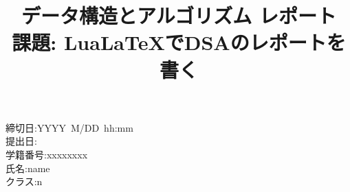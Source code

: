 \documentclass{article}
\title{\bf データ構造とアルゴリズム レポート \\ 課題: Lua\LaTeX でDSAのレポートを書く}
\author{}
\date{}
\begin{document}
\maketitle

\begin{description}
	\item[\rm \large 締切日:YYYY\, M/DD\, hh:mm]
	\item[\rm \large 提出日: \editdate ]
	\item[\rm \large 学籍番号:xxxxxxxx]
	\item[\rm \large 氏名:name]
	\item[\rm \large クラス:n]
\end{description}

\end{document}
